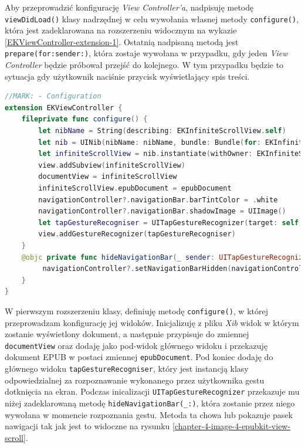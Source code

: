 Aby przeprowadzić konfigurację \textit{View Controller’a}, nadpisuję metodę \texttt{viewDidLoad()} klasy nadrzędnej w celu wywołania własnej metody \texttt{configure()}, która jest zadeklarowana na rozszerzeniu widocznym na wykazie \ref{EKViewController-extension-1}. Ostatnią nadpisaną metodą jest \texttt{prepare(for:sender:)}, która zostaje wywołana w przypadku, gdy jeden \textit{View Controller} będzie próbował przejść do kolejnego. W tym przypadku będzie to sytuacja gdy użytkownik naciśnie przycisk wyświetlający spis treści.

\begin{lstlisting}[language=swift,caption={Rozszerzenie klasy texttt{EKViewController} o metody konfiguracji},label=EKViewController-extension-1]
//MARK: - Configuration
extension EKViewController {
    fileprivate func configure() {
        let nibName = String(describing: EKInfiniteScrollView.self)
        let nib = UINib(nibName: nibName, bundle: Bundle(for: EKInfiniteScrollView.classForCoder()))
        let infiniteScrollView = nib.instantiate(withOwner: EKInfiniteScrollView.self, options: nil).first as! EKInfiniteScrollView
        view.addSubview(infiniteScrollView)
        documentView = infiniteScrollView
        infiniteScrollView.epubDocument = epubDocument
        navigationController?.navigationBar.barTintColor = .white
        navigationController?.navigationBar.shadowImage = UIImage()
        let tapGestureRecogniser = UITapGestureRecognizer(target: self, action: #selector(hideNavigationBar(_:)))
        view.addGestureRecognizer(tapGestureRecogniser)
    }
    @objc private func hideNavigationBar(_ sender: UITapGestureRecognizer){
         navigationController?.setNavigationBarHidden(navigationController?.isNavigationBarHidden == false, animated: true)
    }
}
\end{lstlisting}

W pierwszym rozszerzeniu klasy, definiuję metodę \texttt{configure()}, w której przeprowadzam konfigurację jej widoków. Inicjalizuję z pliku \textit{Xib} widok w którym zostanie wyświetlony dokument, a następnie przypisuje do zmiennej \texttt{documentView} oraz dodaję jako pod-widok głównego widoku i przekazuję dokument EPUB w postaci zmiennej \texttt{epubDocument}. Pod koniec dodaję do głównego widoku \texttt{tapGestureRecogniser}, który jest instancją klasy odpowiedzialnej za rozpoznawanie wykonanego przez użytkownika gestu dotknięcia na ekran. Podczas inicalizacji \texttt{UITapGestureRecognizer} przekazuje mu niżej zadeklarowaną metodę \texttt{hideNavigationBar(\_:)}, która zostanie przez niego wywołana w momencie rozpoznania gestu. Metoda ta chowa lub pokazuje pasek nawigacji tak jak jest to widoczne na rysunku \ref{chapter-4-image-4-epubkit-view-scroll}.

